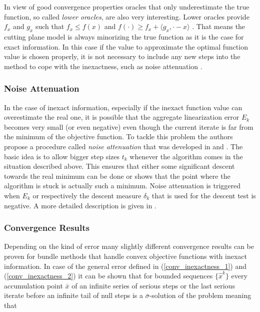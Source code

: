 In view of good convergence properties oracles that only underestimate the true function, so called \emph{lower oracles}, are also very interesting.
Lower oracles provide \(f_x\) and \(g_x\) such that \(f_x \leq f(x) \) and \(f(\cdot) \geq f_x + \langle g_x, \cdot - x\rangle\) . That means the cutting plane model is always minorizing the true function as it is the case for exact information.
In this case if the value to approximate the optimal function value is chosen properly, it is not necessary to include any new steps into the method to cope with the inexactness, such as noise attenuation \cite[Corollary 5.2, p. 256]{Oliveira2014}.

\subsubsection{Noise Attenuation}

In the case of inexact information, especially if the inexact function value can overestimate the real one, it is possible that the aggregate linearization error \(E_k\) becomes very small (or even negative) even though the current iterate is far from the minimum of the objective function.
To tackle this problem the authors propose a procedure called \emph{noise attenuation} that was developed in \cite{Hintermueller2001} and \cite{Kiwiel2006}.
The basic idea is to allow bigger step sizes \(t_k\) whenever the algorithm comes in the situation described above. This ensures that either some significant descent towards the real minimum can be done or shows that the point where the algorithm is stuck is actually such a minimum.
Noise attenuation is triggered when \(E_k\) or respectively the descent measure \(\delta_k\) that is used for the descent test is negative. A more detailed description is given in \cite{Oliveira2014}.

\subsubsection{Convergence Results}
Depending on the kind of error many slightly different convergence results can be proven for bundle methods that handle convex objective functions with inexact information.
In case of the general error defined in (\ref{conv_inexactness_1})  and (\ref{conv_inexactness_2}) it can be shown that for bounded sequences \(\{\hat{x}^k\}\) every accumulation point \(\bar{x}\) of an infinite series of serious steps or the last serious iterate before an infinite tail of null steps is a \(\bar{\sigma}\)-solution of the problem meaning that 

